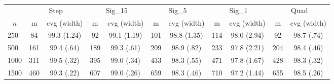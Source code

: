 \documentclass{article}
\begin{document}
\begin{tabular}{lcccccccccc}
   \hline
 
           & \multicolumn{2}{c}{Step}& \multicolumn{2}{c}{Sig\_15}& \multicolumn{2}{c}{Sig\_5}& \multicolumn{2}{c}{Sig\_1}& \multicolumn{2}{c}{Quad} \\ 
             \cmidrule(l{2pt}r{2pt}){2-3} \cmidrule(l{2pt}r{2pt}){4-5} \cmidrule(l{2pt}r{2pt}){6-7} \cmidrule(l{2pt}r{2pt}){8-9}  \cmidrule(l{2pt}r{2pt}){10-11} 
             \multicolumn{1}{c}{$n$} & \multicolumn{1}{c}{m}& \multicolumn{1}{c}{cvg (width)}& \multicolumn{1}{c}{m}& \multicolumn{1}{c}{cvg (width)}& \multicolumn{1}{c}{m}& \multicolumn{1}{c}{cvg (width)}& \multicolumn{1}{c}{m}& \multicolumn{1}{c}{cvg (width)}& \multicolumn{1}{c}{m}& \multicolumn{1}{c}{cvg (width)} \\ \hline
        250 & 84 & 99.3 (1.24) & 92 & 99.1 (1.19) & 101 & 98.8 (1.35) & 114 & 98.0 (2.94) & 92 & 98.7 (.74) \\ 
  500 & 161 & 99.4 (.64) & 189 & 99.3 (.61) & 209 & 98.9 (.82) & 233 & 97.8 (2.21) & 204 & 98.4 (.46) \\ 
  1000 & 311 & 99.5 (.32) & 395 & 99.0 (.34) & 433 & 98.3 (.55) & 471 & 97.8 (1.67) & 428 & 98.3 (.32) \\ 
  1500 & 460 & 99.3 (.22) & 607 & 99.0 (.26) & 659 & 98.3 (.46) & 710 & 97.2 (1.44) & 655 & 98.5 (.26) \\ 
   \hline
\end{tabular}
\end{document}
